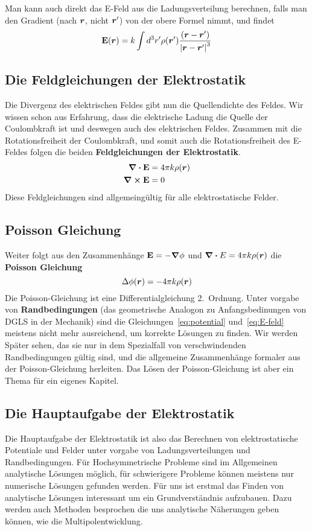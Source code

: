 Man kann auch direkt das E-Feld aus die Ladungsverteilung berechnen, falls 
man den Gradient (nach $\vb*r$, nicht $\vb*r'$) von der obere Formel nimmt, 
und findet
\begin{equation}%
  \label{eq:E-feld}
  \vb E(\vb*r) = k \int d^3r' 
  \rho(\vb*r')\frac{(\vb*r-\vb*r')}{\abs{\vb*r-\vb*r'}^3} 
\end{equation}

\subsection{Die Feldgleichungen der Elektrostatik}%
\label{ssub:Die-Feldgleichungen}
Die Divergenz des elektrischen Feldes gibt nun die Quellendichte des Feldes.
Wir wissen schon aus Erfahrung, dass die elektrische Ladung die Quelle der 
Coulombkraft ist und deswegen auch des elektrischen Feldes. Zusammen mit die
Rotationsfreiheit der Coulombkraft, und somit auch die Rotationsfreiheit des
E-Feldes folgen die beiden \textbf{Feldgleichungen der Elektrostatik}.
\begin{equation}
  \begin{aligned}
    \div \vb E &= 4\pi k \rho(\vb*r)\\
    \curl \vb E &= 0
  \end{aligned}
\end{equation}
Diese Feldgleichungen sind allgemeingültig für alle elektrostatische Felder.

\subsection{Poisson Gleichung}%
Weiter folgt aus den Zusammenhänge $\vb E = -\grad \phi$ und 
$\div E = 4\pi k \rho(\vb*r)$ die \textbf{Poisson Gleichung} 
\begin{equation}
  \Delta \phi(\vb*r) = - 4\pi k \rho(\vb*r)
\end{equation}
Die Poisson-Gleichung ist eine Differentialgleichung 2.\ Ordnung. Unter 
vorgabe von \textbf{Randbedingungen} (das geometrische Analogon zu Anfangsbedinungen von DGLS in der Mechanik) sind die Gleichungen~\ref{eq:potential} und~\ref{eq:E-feld} meistens nicht mehr ausreichend, um korrekte Lösungen zu finden. 
Wir werden Später sehen, das sie nur in dem Spezialfall von verschwindenden
Randbedingungen gültig sind, und die allgemeine Zusammenhänge formaler aus der Poisson-Gleichung herleiten.
Das Lösen der Poisson-Gleichung ist aber ein Thema für ein eigenes Kapitel. 

\subsection{Die Hauptaufgabe der Elektrostatik} 
Die Hauptaufgabe der Elektrostatik ist also das Berechnen von 
elektrostatische Potentiale und Felder unter vorgabe von 
Ladungsverteilungen und Randbedingungen. 
Für Hochsymmetrische Probleme sind im Allgemeinen analytische 
Lösungen möglich, für schwierigere Probleme können meistens nur numerische 
Lösungen gefunden werden. Für uns ist erstmal das Finden von analytische
Lösungen interessant um ein Grundverständnis aufzubauen. Dazu werden auch
Methoden besprochen die uns analytische Näherungen geben können, wie die
Multipolentwicklung.
